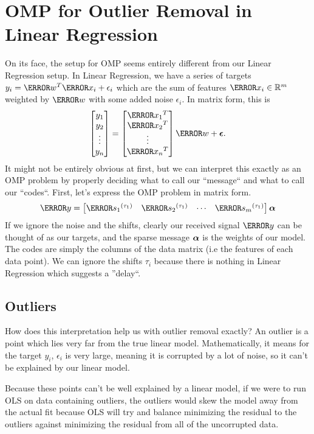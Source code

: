   \section{OMP for Outlier Removal in Linear Regression}
  On its face, the setup for OMP seems entirely different from our Linear Regression setup.
  In Linear Regression, we have a series of targets $y_i = \V{w}^T\V{x_i}+\epsilon_i$ which are the sum of features $\V{x_i}\in\mathbb{R}^m$ weighted by $\V{w}$ with some added noise $\epsilon_i$.
  In matrix form, this is
  \[
	\begin{bmatrix}
	  y_1\\y_2\\\vdots\\y_n
	\end{bmatrix} = \begin{bmatrix}
	  \V{x_1}^T\\\V{x_2}^T\\\vdots\\\V{x_n}^T
	\end{bmatrix}\V{w} + \bs{\epsilon}.
  \]
  It might not be entirely obvious at first, but we can interpret this exactly as an OMP problem by properly deciding what to call our ``message`` and what to call our ``codes``.
  First, let's express the OMP problem in matrix form.
  \[
	\V{y} = \begin{bmatrix}
	  \V{s_1}^{(\tau_1)} & \V{s_2}^{(\tau_1)} & \cdots & \V{s_m}^{(\tau_1)}
	\end{bmatrix}\bs{\alpha}
  \]
  If we ignore the noise and the shifts, clearly our received signal $\V{y}$ can be thought of as our targets, and the sparse message $\boldsymbol{\alpha}$ is the weights of our model.
  The codes are simply the columns of the data matrix (i.e the features of each data point). We can ignore the shifts $\tau_i$ because there is nothing in Linear Regression which suggests a ''delay``.
  \subsection{Outliers}
  How does this interpretation help us with outlier removal exactly?
  An outlier is a point which lies very far from the true linear model.
  Mathematically, it means for the target $y_i$, $\epsilon_i$ is very large, meaning it is corrupted by a lot of noise, so it can't be explained by our linear model.

  Because these points can't be well explained by a linear model, if we were to run OLS on data containing outliers, the outliers would skew the model away from the actual fit because OLS will try and balance minimizing the residual to the outliers against minimizing the residual from all of the uncorrupted data.
